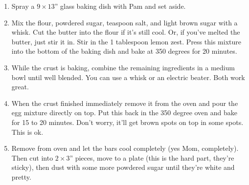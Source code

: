 \documentclass{article}
\begin{document}
\begin{enumerate}
      \item Spray a $9\times13$'' glass baking dish with Pam and set aside.

      \item Mix the flour, powdered sugar,  teaspoon salt, and light brown sugar
            with a whisk. Cut the butter into the flour if it's still cool. Or, if you've melted
            the butter, just stir it in. Stir in the 1 tablespoon lemon zest. Press this mixture
            into the bottom of the baking dish and bake at 350 degrees for 20 minutes.

      \item While the crust is baking, combine the remaining ingredients in a medium bowl until
            well blended. You can use a whisk or an electric beater. Both work great.

      \item When the crust finished immediately remove it from the oven and pour the egg mixture
            directly on top. Put this back in the 350 degree oven and bake for 15 to 20 minutes. Don't
            worry, it'll get brown spots on top in some spots. This is ok.

      \item Remove from oven and let the bars cool completely (yes Mom, completely). Then cut into
            $2\times3$'' pieces, move to a plate (this is the hard part, they're sticky), then dust
            with some more powdered sugar until they're white and pretty.
\end{enumerate}
\end{document}
